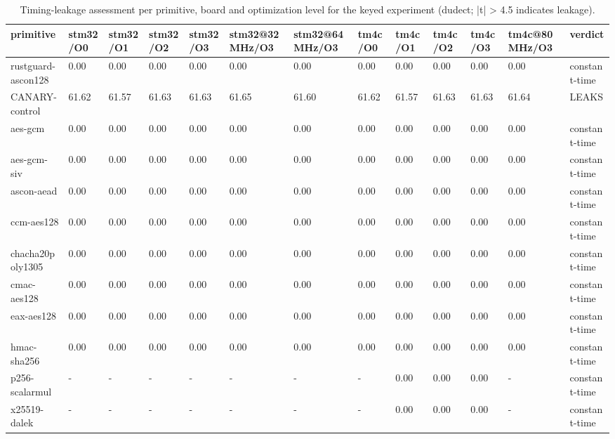\begin{table}[t]
  \centering
  \caption{Timing-leakage assessment per primitive, board and optimization level for the keyed experiment (dudect; |t| > 4.5 indicates leakage).}
  \label{tab:leakagematrixkeyed}
  \begin{tabular}{lllllllllllll}
    \toprule
    primitive & stm32/O0 & stm32/O1 & stm32/O2 & stm32/O3 & stm32@32MHz/O3 & stm32@64MHz/O3 & tm4c/O0 & tm4c/O1 & tm4c/O2 & tm4c/O3 & tm4c@80MHz/O3 & verdict \\
    \midrule
    rustguard-ascon128 & 0.00 & 0.00 & 0.00 & 0.00 & 0.00 & 0.00 & 0.00 & 0.00 & 0.00 & 0.00 & 0.00 & constant-time \\
    CANARY-control & 61.62 & 61.57 & 61.63 & 61.63 & 61.65 & 61.60 & 61.62 & 61.57 & 61.63 & 61.63 & 61.64 & LEAKS \\
    aes-gcm & 0.00 & 0.00 & 0.00 & 0.00 & 0.00 & 0.00 & 0.00 & 0.00 & 0.00 & 0.00 & 0.00 & constant-time \\
    aes-gcm-siv & 0.00 & 0.00 & 0.00 & 0.00 & 0.00 & 0.00 & 0.00 & 0.00 & 0.00 & 0.00 & 0.00 & constant-time \\
    ascon-aead & 0.00 & 0.00 & 0.00 & 0.00 & 0.00 & 0.00 & 0.00 & 0.00 & 0.00 & 0.00 & 0.00 & constant-time \\
    ccm-aes128 & 0.00 & 0.00 & 0.00 & 0.00 & 0.00 & 0.00 & 0.00 & 0.00 & 0.00 & 0.00 & 0.00 & constant-time \\
    chacha20poly1305 & 0.00 & 0.00 & 0.00 & 0.00 & 0.00 & 0.00 & 0.00 & 0.00 & 0.00 & 0.00 & 0.00 & constant-time \\
    cmac-aes128 & 0.00 & 0.00 & 0.00 & 0.00 & 0.00 & 0.00 & 0.00 & 0.00 & 0.00 & 0.00 & 0.00 & constant-time \\
    eax-aes128 & 0.00 & 0.00 & 0.00 & 0.00 & 0.00 & 0.00 & 0.00 & 0.00 & 0.00 & 0.00 & 0.00 & constant-time \\
    hmac-sha256 & 0.00 & 0.00 & 0.00 & 0.00 & 0.00 & 0.00 & 0.00 & 0.00 & 0.00 & 0.00 & 0.00 & constant-time \\
    p256-scalarmul & - & - & - & - & - & - & - & 0.00 & 0.00 & 0.00 & - & constant-time \\
    x25519-dalek & - & - & - & - & - & - & - & 0.00 & 0.00 & 0.00 & - & constant-time \\
    \bottomrule
  \end{tabular}
\end{table}
